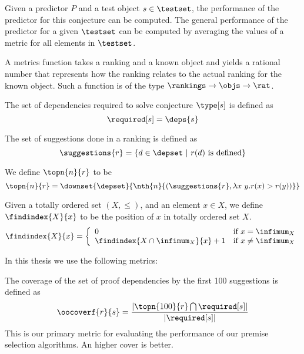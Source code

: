 Given a predictor $P$ and a test object $s \in \testset$,
the performance of the predictor for this conjecture can be computed.
The general performance of the predictor for a given $\testset$
can be computed by averaging the values of a metric for all elements in $\testset$.

\begin{definition}
  A metrics function takes a ranking and a known object and yields a rational number
  that represents how the ranking relates to the actual ranking for the known object.
  Such a function is of the type $\rankings \rightarrow \objs \rightarrow \rat$.
\end{definition}

\begin{definition} The set of dependencies required to solve conjecture $\type[s]$ is defined as
  \[ \required[s] = \deps{s} \]
\end{definition}

\begin{definition} The set of suggestions done in a ranking is defined as
  \[ \suggestions{r} = \{ d \in \depset ~|~ r(d) ~\text{is defined} \} \]
\end{definition}

\begin{definition} We define $\topn{n}{r}$ to be
  \[ \topn{n}{r} = \downset{\depset}{\nth{n}{(\suggestions{r}, \lambda x~y. r(x) > r(y))}} \]
\end{definition}

\begin{definition}
  Given a totally ordered set $(X, \leq)$, and an element $x \in X$, we define $\findindex{X}{x}$ to be the position of $x$ in totally ordered set $X$.
  \[ \findindex{X}{x} = \left\{
    \begin{array}{ll}
      0 & \text{if~} x = \infimum_X \\
      \findindex{X \cap \infimum_X}{x}+1 & \text{if~} x \neq \infimum_X \\
    \end{array}
    \right.
  \]
\end{definition}

In this thesis we use the following metrics:
\begin{definition}[\oocover]
  The coverage of the set of proof dependencies by the first 100 suggestions is defined as
  \[ \oocoverf{r}{s} = \frac{ |\topn{100}{r} \bigcap \required[s]| } { |\required[s]| } \]
  This is our primary metric for evaluating the performance of our premise selection algorithms.
  An higher cover is better.
\end{definition}

